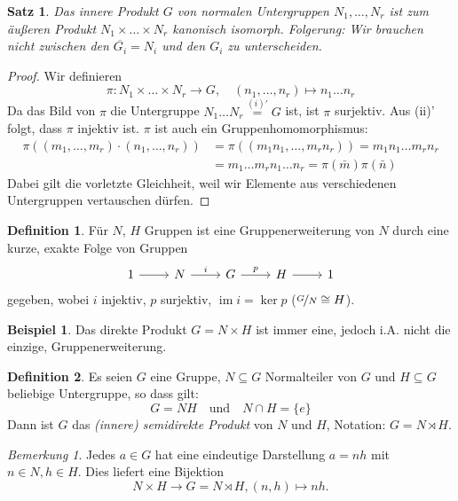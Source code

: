 \documentclass[12pt]{scrartcl} %
\DeclareMathOperator{\im}{im}
\newtheorem{thm}{Satz}
\theoremstyle{definition}
\newtheorem*{defn}{Definition}
\newtheorem{ex}{Beispiel}
\theoremstyle{remark}
\newtheorem*{nb}{Bemerkung}
\begin{document}
\begin{thm}
	Das innere Produkt $G$ von normalen Untergruppen $N_1,\dots,N_r$ ist zum äußeren Produkt $N_1\times\dots \times N_r$ kanonisch isomorph.
	Folgerung: Wir brauchen nicht zwischen den $\overline{G_i}=N_i$ und den $G_i$ zu unterscheiden.
\end{thm}

\begin{proof}
	Wir definieren $$\pi: N_1\times\dots\times N_r \longrightarrow G,\quad (n_1,\dots,n_r)\mapsto n_1\dots n_r$$
	Da das Bild von $\pi$ die Untergruppe $N_1\dots N_r \overset{(i)'}{=} G$ ist, ist $\pi$ surjektiv.
	Aus (ii)' folgt, dass $\pi$ injektiv ist.
	$\pi$ ist auch ein Gruppenhomomorphismus:
	\begin{align*}
		\pi((m_1,\dots,m_r)\cdot (n_1,\dots,n_r)) &= \pi((m_1n_1,\dots,m_rn_r)) = m_1n_1\dots m_rn_r\\
		&= m_1\dots m_rn_1\dots n_r = \pi(\bar m)\pi(\bar n)
	\end{align*}
	Dabei gilt die vorletzte Gleichheit, weil wir Elemente aus verschiedenen Untergruppen vertauschen dürfen.
\end{proof}

\begin{defn}
	Für \(N\), \(H\) Gruppen ist eine Gruppenerweiterung von $N$ durch eine kurze, exakte Folge von Gruppen
	\[ \begin{tikzcd}
		1 \arrow[r] & N \arrow[r, "i"] & G \arrow[r, "p"] & H \arrow[r] & 1
	\end{tikzcd} \]
	gegeben, wobei $i$ injektiv, $p$ surjektiv, $\im i = \ker p$ ($\nicefrac{G}{N} \cong H$). %
\end{defn}

\begin{ex}
	Das direkte Produkt $G=N\times H$ ist immer eine, jedoch i.A. nicht die einzige, Gruppenerweiterung.
\end{ex}

\begin{defn}
	Es seien $G$ eine Gruppe, $N\subseteq G$ Normalteiler von $G$ und $H\subseteq G$ beliebige Untergruppe, so dass gilt:
	$$G=NH \quad \text{und} \quad N\cap H = \{e\}$$
	Dann ist $G$ das \emph{(innere) semidirekte Produkt} von $N$ und $H$, Notation: $G=N\rtimes H$.
\end{defn}

\begin{nb}
	Jedes $a\in G$ hat eine eindeutige Darstellung $a=nh$ mit $n\in N, h\in H$.
	Dies liefert eine Bijektion $$N\times H \to G=N\rtimes H, (n,h)\mapsto nh.$$
\end{nb}
\end{document}
